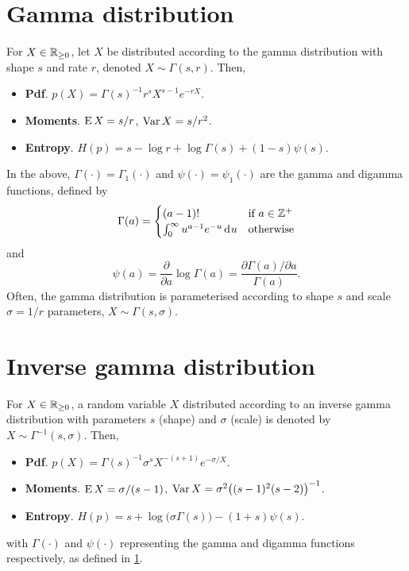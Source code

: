 \section{Gamma distribution}
\label{apx:gammadist}

\vspace{-0.3em}
For $X\in\mathbb{R}_{\geq 0}$, let $X$ be distributed according to the gamma distribution with shape $s$ and rate $r$, denoted $X\sim\Gamma(s,r)$. 
Then,
\begin{itemize}
  \item \textbf{Pdf}. $p(X) = \Gamma(s)^{-1} r^s X^{s-1} e^{-rX}$.
  \item \textbf{Moments}. $\operatorname{E} X=s/r$, $\operatorname{Var} X = s/r^2$.
  \item \textbf{Entropy}. $H(p)=s - \log r + \log \Gamma(s) + (1-s)\psi(s)$.
\end{itemize}
In the above, $\Gamma(\cdot) = \Gamma_1(\cdot)$ and $\psi(\cdot) = \psi_1(\cdot)$ are the gamma and digamma functions, defined by
\[
  \Gamma(a) = 
  \begin{cases}
    (a-1)! &\text{if } a \in \mathbb{Z}^+ \\
    \int_0^\infty u^{a-1} e^{-u} \operatorname{d}\hspace{0.5pt}\! u &\text{otherwise} \\
  \end{cases}
\]
and
\[
  \psi(a) = \frac{\partial}{\partial a}\log \Gamma(a) = \frac{\partial\Gamma(a)/\partial a}{\Gamma(a)}.
\]
Often, the gamma distribution is parameterised according to shape $s$ and scale $\sigma = 1/r$ parameters, $X\sim\Gamma(s,\sigma)$.
\vspace{-0.6em}

\section{Inverse gamma distribution}
\label{def:invgam}

\vspace{-0.3em}
For $X\in\mathbb{R}_{\geq 0}$, a random variable $X$ distributed according to an inverse gamma distribution with parameters $s$ (shape) and $\sigma$ (scale) is denoted by $X\sim\Gamma^{-1}(s,\sigma)$.
Then,
\begin{itemize}
  \item \textbf{Pdf}. $p(X) = \Gamma(s)^{-1} \sigma^s  X^{-(s+1)} e^{-\sigma/X}$.
  \item \textbf{Moments}. $\operatorname{E} X=\sigma/(s-1)$, $\operatorname{Var} X = \sigma^2\big((s-1)^2(s-2) \big)^{-1}$.
  \item \textbf{Entropy}. $H(p)= s + \log \big(\sigma\Gamma(s)\big) - (1+s)\psi(s)$.
\end{itemize}
with $\Gamma(\cdot)$ and $\psi(\cdot)$ representing the gamma and digamma functions respectively, as defined in \cref{apx:gammadist}.

